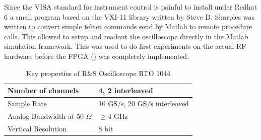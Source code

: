 Since the VISA standard for instrument control is painful to install under
Redhat 6 a small program based on the VXI-11 library written by
Steve D. Sharples 
was written to convert simple telnet commands send by Matlab
to remote procedure calls. This allowed to setup and readout the oscilloscope
directly in the Matlab simulation framework. This was used to do first experiments
on the actual \gls{RF} hardware before the \gls{FPGA} () was
completely implemented. \\

\begin{table}[h]
  \centering
  \begin{tabular}{|l|l|}
    \hline
    Number of channels & 4, 2 interleaved \\ \hline
    Sample Rate & 10 $\text{GS}/\text{s}$, 20 $\text{GS}/\text{s}$ interleaved \\ \hline
    Analog Bandwidth at 50 $\Omega$ & $\geq 4$ GHz \\ \hline
    Vertical Resolution & 8 bit \\ \hline
  \end{tabular}
  \caption{Key properties of R\&S Oscilloscope RTO 1044}
  \label{tab:awg}
\end{table}

